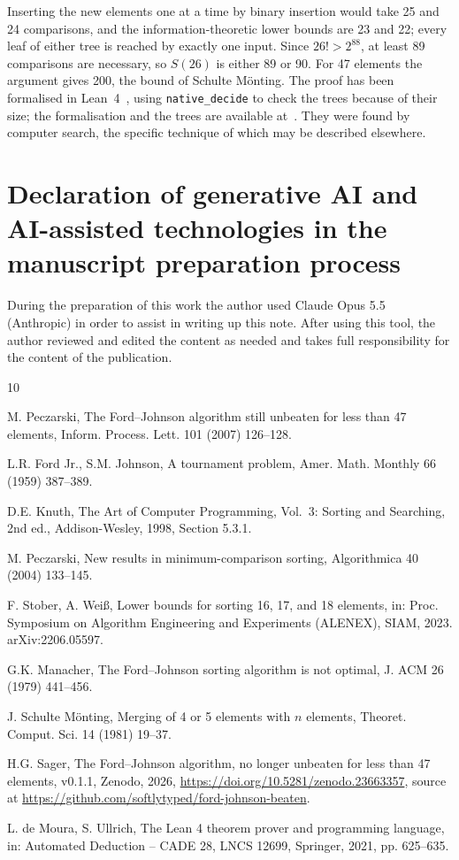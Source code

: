 \documentclass[final,3p,times]{elsarticle}
\begin{document}
Inserting the new elements one at a time by binary insertion would take 25 and 24
comparisons, and the information-theoretic lower bounds are 23 and 22; every leaf of either
tree is reached by exactly one input. Since $26! > 2^{88}$, at least 89 comparisons are
necessary, so $S(26)$ is either 89 or 90. For 47 elements the argument gives 200, the bound
of Schulte M\"onting. The proof has been formalised in Lean~4~\cite{Lean4}, using
\texttt{native\_decide} to check the trees because of their size; the formalisation and the
trees are available at~\cite{data}. They were found by computer search, the specific
technique of which may be described elsewhere.

\section*{Declaration of generative AI and AI-assisted technologies in the manuscript
preparation process}
During the preparation of this work the author used Claude Opus 5.5 (Anthropic) in order to
assist in writing up this note. After using this tool, the author reviewed and edited the
content as needed and takes full responsibility for the content of the publication.

\begin{thebibliography}{10}
\footnotesize
\setlength{\itemsep}{0pt}\setlength{\parskip}{0pt}

M. Peczarski, The Ford--Johnson algorithm still unbeaten for less than 47 elements,
Inform. Process. Lett. 101 (2007) 126--128.

L.R. Ford Jr., S.M. Johnson, A tournament problem, Amer. Math. Monthly 66 (1959) 387--389.

D.E. Knuth, The Art of Computer Programming, Vol.~3: Sorting and Searching, 2nd ed.,
Addison-Wesley, 1998, Section 5.3.1.

M. Peczarski, New results in minimum-comparison sorting, Algorithmica 40 (2004) 133--145.

F. Stober, A. Wei{\ss}, Lower bounds for sorting 16, 17, and 18 elements, in: Proc.
Symposium on Algorithm Engineering and Experiments (ALENEX), SIAM, 2023.
arXiv:2206.05597.

G.K. Manacher, The Ford--Johnson sorting algorithm is not optimal, J. ACM 26 (1979)
441--456.

J. Schulte M\"onting, Merging of 4 or 5 elements with $n$ elements, Theoret. Comput. Sci.
14 (1981) 19--37.

H.G. Sager, The Ford--Johnson algorithm, no longer unbeaten for less than 47 elements,
v0.1.1, Zenodo, 2026, \url{https://doi.org/10.5281/zenodo.23663357}, source at
\url{https://github.com/softlytyped/ford-johnson-beaten}.

L. de Moura, S. Ullrich, The Lean 4 theorem prover and programming language, in: Automated
Deduction -- CADE 28, LNCS 12699, Springer, 2021, pp. 625--635.

\end{thebibliography}
\end{document}
